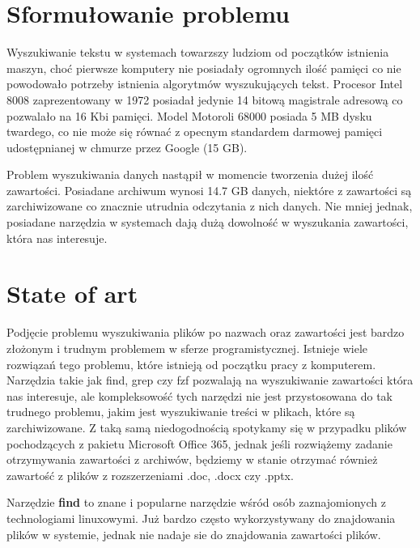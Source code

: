 \section{Sformułowanie problemu}
Wyszukiwanie tekstu w systemach towarzszy ludziom od początków istnienia maszyn,
choć pierwsze komputery nie posiadały ogromnych ilość pamięci co nie powodowało
potrzeby istnienia algorytmów wyszukujących tekst. Procesor Intel 8008 
zaprezentowany w 1972 posiadał jedynie 14 bitową magistrale adresową co 
pozwalało na 16 Kbi pamięci. Model Motoroli 68000 posiada 5 MB dysku twardego,
co nie może się równać z opecnym standardem darmowej pamięci udostępnianej w 
chmurze przez Google (15 GB).

Problem wyszukiwania danych nastąpił w momencie tworzenia dużej ilość zawartości.
Posiadane archiwum wynosi 14.7 GB danych, niektóre z zawartości są 
zarchiwizowane co znacznie utrudnia odczytania z nich danych. Nie mniej jednak,
posiadane narzędzia w systemach dają dużą dowolność w wyszukania zawartości,
która nas interesuje.

\section{State of art}

Podjęcie problemu wyszukiwania plików po nazwach oraz zawartości jest bardzo
złożonym i trudnym problemem w sferze programistycznej. Istnieje wiele rozwiązań
tego problemu, które istnieją od początku pracy z komputerem. Narzędzia takie
jak find, grep czy fzf \cite{internet:ToolsRegex} pozwalają na wyszukiwanie zawartości która nas interesuje,
ale kompleksowość tych narzędzi nie jest przystosowana do tak trudnego problemu,
jakim jest wyszukiwanie treści w plikach, które są zarchiwizowane. Z taką samą
niedogodnością spotykamy się w przypadku plików pochodzących z pakietu Microsoft
Office 365, jednak jeśli rozwiążemy zadanie otrzymywania zawartości z archiwów,
będziemy w stanie otrzymać również zawartość z plików z rozszerzeniami .doc,
.docx czy .pptx.

Narzędzie \textbf{find} to znane i popularne narzędzie wśród osób zaznajomionych z
technologiami linuxowymi. Już bardzo często wykorzystywany do znajdowania plików
w systemie, jednak nie nadaje sie do znajdowania zawartości plików.

